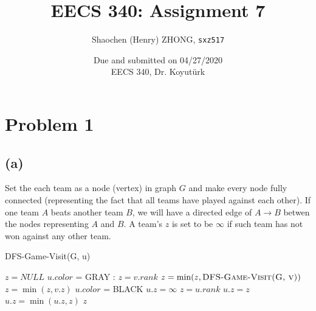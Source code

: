 \documentclass[11pt]{article}
\newcommand{\ilc}{\texttt}
\begin{document}
\title{\textbf{EECS 340: Assignment 7}}

\author{Shaochen (Henry) ZHONG, \ilc{sxz517}}
\date{Due and submitted on 04/27/2020 \\ EECS 340, Dr. Koyut{\"u}rk}
\maketitle

\section{Problem 1}

\subsection{(a)}

Set the each team as a node (vertex) in graph $G$ and make every node fully connected (representing the fact that all teams have played against each other). If one team $A$ beats another team $B$, we will have a directed edge of $A \rightarrow B$ betwen the nodes representing $A$ and $B$. A team's $z$ is set to be $\infty$ if such team has not won against any other team.

\begin{algorithm}[H]
\caption{DFS-Game-Visit(G, u)}
    \begin{algorithmic}[1]
        \State $z = NULL$ 
        \State $u.color$ = GRAY
        :
                \State $z = v.rank$ 
                \State $z = \min(z, \textsc{DFS-Game-Visit(G, v)})$ 
            \Else
                \State $z = \min(z, v.z)$ 
            \EndIf
        \EndFor
        \State $u.color$ = BLACK
         
            \State $u.z = \infty$ 
            \State $z = u.rank$ 
        \Else
                \State $u.z = z$
            \Else
                \State $u.z = \min(u.z, z)$ 
            \EndIf
        \EndIf
        \State \Return $z$
    \end{algorithmic}
\end{algorithm}
\end{document}
